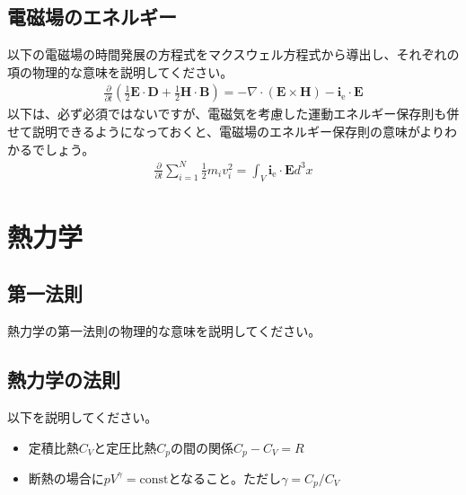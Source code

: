 \documentclass{ltjarticle}
\begin{document}
\subsection{電磁場のエネルギー}
以下の電磁場の時間発展の方程式をマクスウェル方程式から導出し、それぞれの項の物理的な意味を説明してください。
\begin{align}
    \frac{\partial}{\partial t}
    \left(\frac{1}{2}\bm{E}\cdot\bm{D} + \frac{1}{2}\bm{H}\cdot\bm{B}\right) = - \nabla\cdot\left(\bm{E}\times\bm{H}\right) - \bm{i}_\mathrm{e}\cdot\bm{E}
\end{align}
以下は、必ず必須ではないですが、電磁気を考慮した運動エネルギー保存則も併せて説明できるようになっておくと、電磁場のエネルギー保存則の意味がよりわかるでしょう。
\begin{align*}
    \frac{\partial}{\partial t} \sum_{i=1}^N
    \frac{1}{2}m_i v_i^2 = \int_V \bm{i}_\mathrm{e}\cdot\bm{E} d^3x
\end{align*}
\section{熱力学}
\subsection{第一法則}
熱力学の第一法則の物理的な意味を説明してください。
\subsection{熱力学の法則}
以下を説明してください。
\begin{itemize}
    \item 定積比熱$C_V$と定圧比熱$C_p$の間の関係$C_p-C_V=R$
    \item 断熱の場合に$pV^\gamma=\mathrm{const}$となること。ただし$\gamma=C_p/C_V$
\end{itemize}
\end{document}
